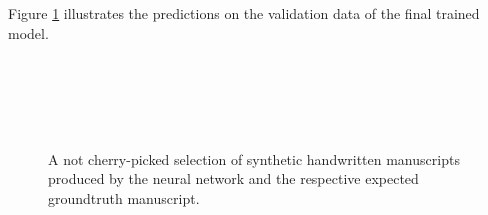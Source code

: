 Figure \ref{fig:resultingsamples} illustrates the predictions on the validation data of the final trained model.
\begin{figure}[!htpb]
\centering
{} 
\hspace*{0.4in} %
\\
\hspace*{0.4in} %
\\
\hspace*{0.4in} %
\\
\hspace*{0.4in} %
\\
\addtocounter{subfigure}{-8}
\hspace*{0.4in} %




\caption{A not cherry-picked selection of synthetic handwritten manuscripts produced by the neural network and the respective expected groundtruth manuscript.} \label{fig:resultingsamples}
\end{figure}

